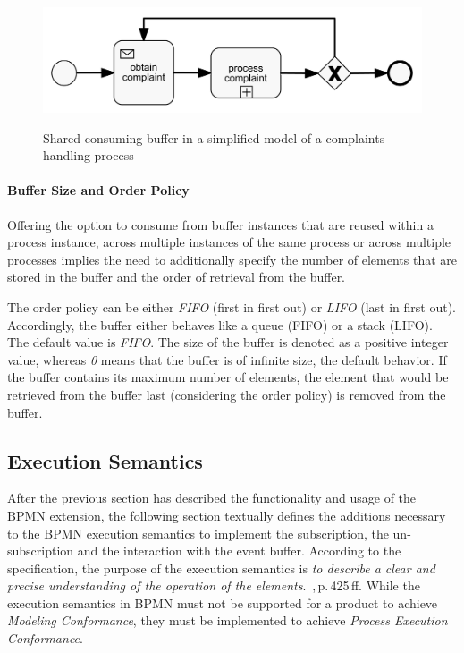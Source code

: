 \begin{figure}[]
	\myfloatalign
	{\includegraphics[width=1\linewidth]{chapters/concept/bpmnx/ComplaintProcessing.png}}
	\caption{Shared consuming buffer in a simplified model of a complaints handling process}\label{fig:example-complaints}
\end{figure}

\paragraph{Buffer Size and Order Policy}
Offering the option to consume from buffer instances that are reused within a process instance, across multiple instances of the same process or across multiple processes implies the need to additionally specify the number of elements that are stored in the buffer and the order of retrieval from the buffer.

The order policy can be either \textit{FIFO} (first in first out) or \textit{LIFO} (last in first out). Accordingly, the buffer either behaves like a queue (FIFO) or a stack (LIFO). The default value is \textit{FIFO}.
The size of the buffer is denoted as a positive integer value, whereas \textit{0} means that the buffer is of infinite size, the default behavior. If the buffer contains its maximum number of elements, the element that would be retrieved from the buffer last (considering the order policy) is removed from the buffer.

\subsection{Execution Semantics}\label{bpmnx:executionsemantics}

After the previous section has described the functionality and usage of the BPMN extension, the following section textually defines the additions necessary to the BPMN execution semantics to implement the subscription, the un-subscription and the interaction with the event buffer.
According to the specification, the purpose of the execution semantics is \textit{to describe a clear and precise understanding of the operation of the elements}.~\cite{bpmnspec},\,p.\,425\,ff.
While the execution semantics in BPMN must not be supported for a product to achieve \textit{Modeling Conformance}, they must be implemented to achieve \textit{Process Execution Conformance}.

